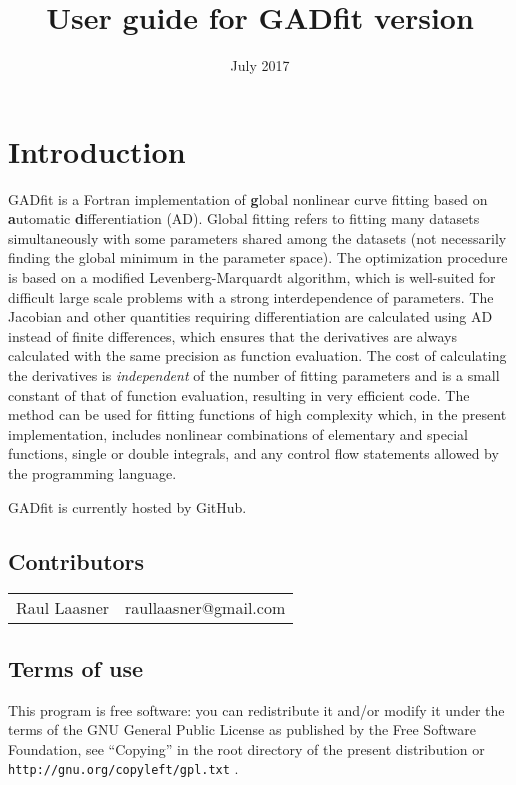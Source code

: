 \documentclass{article}
\title{User guide for GADfit version \version}
\date{July 2017}
\begin{document}
\maketitle
\tableofcontents

\section{Introduction}

GADfit is a Fortran implementation of \textbf{g}lobal nonlinear curve fitting based on \textbf{a}utomatic \textbf{d}ifferentiation (AD). Global fitting refers to fitting many datasets simultaneously with some parameters shared among the datasets (not necessarily finding the global minimum in the parameter space). The optimization procedure is based on a modified Levenberg-Marquardt algorithm, which is well-suited for difficult large scale problems with a strong interdependence of parameters. The Jacobian and other quantities requiring differentiation are calculated using AD instead of finite differences, which ensures that the derivatives are always calculated with the same precision as function evaluation. The cost of calculating the derivatives is \textit{independent} of the number of fitting parameters and is a small constant of that of function evaluation, resulting in very efficient code. The method can be used for fitting functions of high complexity which, in the present implementation, includes nonlinear combinations of elementary and special functions, single or double integrals, and any control flow statements allowed by the programming language.

GADfit is currently hosted by GitHub.

\subsection{Contributors}

\begin{tabular}{ll}
  Raul Laasner & raullaasner@gmail.com \\
\end{tabular}

\subsection{Terms of use}

This program is free software: you can redistribute it and/or modify it under the terms of the GNU General Public License as published by the Free Software Foundation, see ``Copying'' in the root directory of the present distribution or \texttt{http://gnu.org/copyleft/gpl.txt} .
\end{document}
